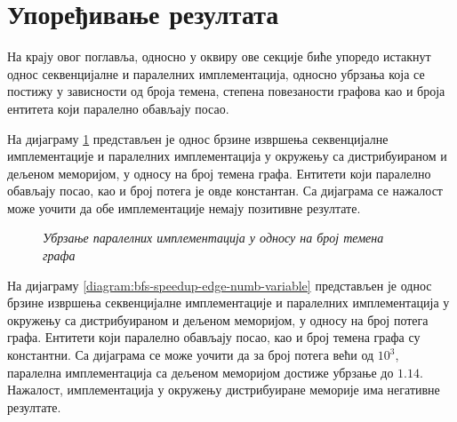 \section{Упоређивање резултата}
На крају овог поглавља, односно у оквиру ове секције биће упоредо истакнут однос секвенцијалне и паралелних имплементација, односно убрзања која се постижу у зависности од броја темена, степена повезаности графова као и броја ентитета који паралелно обављају посао.

\par
На дијаграму \ref{diagram:bfs-speedup-vertex-numb-variable} представљен је однос брзине извршења секвенцијалне имплементације и паралелних имплементација у окружењу са дистрибуираном и дељеном меморијом, у односу на број темена графа. Ентитети који паралелно обављају посао, као и број потега је овде константан. Са дијаграма се нажалост може уочити да обе имплементације немају позитивне резултате.

\begin{figure}[H]
    \centering
    \caption{\textit{Убрзање паралелних имплементација у односу на број темена графа}}
    \label{diagram:bfs-speedup-vertex-numb-variable}
\end{figure}

\par
На дијаграму \ref{diagram:bfs-speedup-edge-numb-variable} представљен је однос брзине извршења секвенцијалне имплементације и паралелних имплементација у окружењу са дистрибуираном и дељеном меморијом, у односу на број потега графа. Ентитети који паралелно обављају посао, као и број темена графа су константни. Са дијаграма се може уочити да за број потега већи од $10^3$, паралелна имплементација са дељеном меморијом достиже убрзање до $1.14$. Нажалост, имплементација у окружењу дистрибуиране меморије има негативне резултате.


